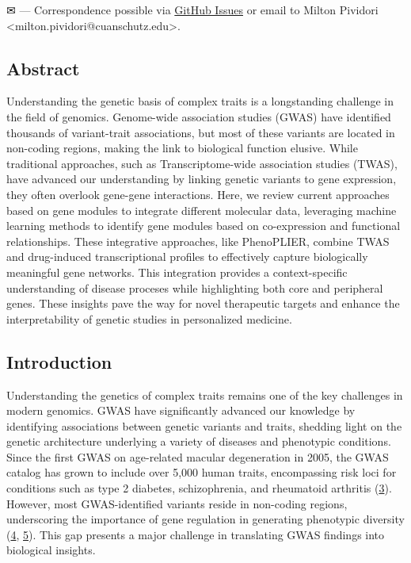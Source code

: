 \leavevmode{}%
✉ --- Correspondence possible via \href{https://github.com/pivlab/annual_review_of_biomedical_data_science/issues}{GitHub Issues}
or email to
Milton Pividori \textless milton.pividori@cuanschutz.edu\textgreater.

\hypertarget{abstract}{%
\subsection{Abstract}\label{abstract}}

Understanding the genetic basis of complex traits is a longstanding challenge in the field of genomics.
Genome-wide association studies (GWAS) have identified thousands of variant-trait associations, but most of these variants are located in non-coding regions, making the link to biological function elusive.
While traditional approaches, such as Transcriptome-wide association studies (TWAS), have advanced our understanding by linking genetic variants to gene expression, they often overlook gene-gene interactions.
Here, we review current approaches based on gene modules to integrate different molecular data, leveraging machine learning methods to identify gene modules based on co-expression and functional relationships.
These integrative approaches, like PhenoPLIER, combine TWAS and drug-induced transcriptional profiles to effectively capture biologically meaningful gene networks.
This integration provides a context-specific understanding of disease proceses while highlighting both core and peripheral genes.
These insights pave the way for novel therapeutic targets and enhance the interpretability of genetic studies in personalized medicine.

\hypertarget{introduction}{%
\subsection{Introduction}\label{introduction}}

Understanding the genetics of complex traits remains one of the key challenges in modern genomics.
GWAS have significantly advanced our knowledge by identifying associations between genetic variants and traits, shedding light on the genetic architecture underlying a variety of diseases and phenotypic conditions.
Since the first GWAS on age-related macular degeneration in 2005, the GWAS catalog has grown to include over 5,000 human traits, encompassing risk loci for conditions such as type 2 diabetes, schizophrenia, and rheumatoid arthritis (\protect\hyperlink{ref-HicyXvA4}{3}).
However, most GWAS-identified variants reside in non-coding regions, underscoring the importance of gene regulation in generating phenotypic diversity (\protect\hyperlink{ref-BqjxxhyF}{4}, \protect\hyperlink{ref-9Pr9idng}{5}).
This gap presents a major challenge in translating GWAS findings into biological insights.

